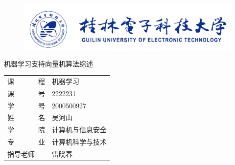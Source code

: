 
\begin{titlepage}
	\begin{center}
		\begin{figure}[!ht]\vspace{-1em}
			\centering
 			\includegraphics{figures/桂电标志.png}
			\vspace{3em}\\

		\end{figure}
		
		\vspace{1.5em}
		
		\vspace{5em}
		\begin{center} {\erhao\hei 机器学习支持向量机算法综述}\end{center}
		
		\vspace{1em}
		{\sanhao
			\begin{center} \renewcommand{\arraystretch}{1.7}
				\begin{tabular}{l@{：}l}
					
					课~~~~~~~程 & 机器学习\\
					课~~~~~~~号 & 2222231\\
					学~~~~~~~号 & 2000500927 \\
					姓~~~~~~~名 & 吴河山 \\
                    学~~~~~~~院 & 计算机与信息安全\\
                    专~~~~~~~业 & 计算机科学与技术\\
					  指导老师  &  雷晓春\\
					

\end{tabular}
\end{center}}
\end{center}
\end{titlepage}
